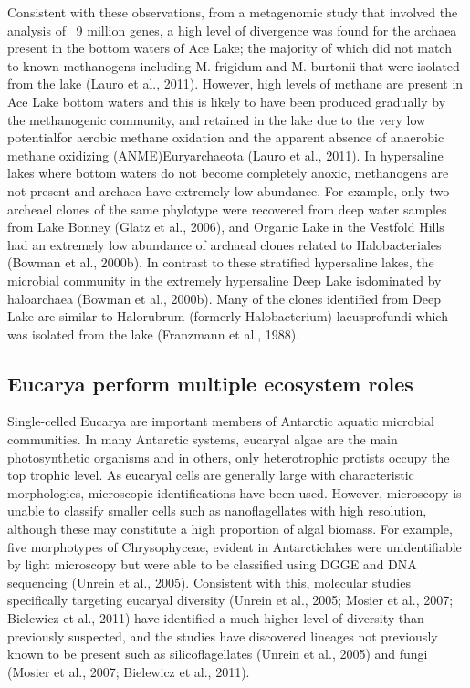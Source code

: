 \documentclass{book}
\begin{document}
Consistent with these observations, from a metagenomic study that involved the analysis of ~9 million genes, a high level of divergence was found for the archaea present in the bottom waters of Ace Lake; the majority of which did not match to known methanogens including M. frigidum and M. burtonii that were isolated from the lake (Lauro et al., 2011). 
However, high levels of methane are present in Ace Lake bottom waters and this is likely to have been produced gradually by the methanogenic community, and retained in the lake due to the very low potentialfor aerobic methane oxidation and the apparent absence of anaerobic methane oxidizing (ANME)Euryarchaeota (Lauro et al., 2011).
In hypersaline lakes where bottom waters do not become completely anoxic, methanogens are not present and archaea have extremely low abundance. 
For example, only two archeael clones of the same phylotype were recovered from deep water samples from Lake Bonney (Glatz et al., 2006), and Organic Lake in the Vestfold Hills had an extremely low abundance of archaeal clones related to Halobacteriales (Bowman et al., 2000b). 
In contrast to these stratified hypersaline lakes, the microbial community in the extremely hypersaline Deep Lake isdominated by haloarchaea (Bowman et al., 2000b). 
Many of the clones identified from Deep Lake are similar to Halorubrum (formerly Halobacterium) lacusprofundi which was isolated from the lake (Franzmann et al., 1988). 

\subsection{Eucarya perform multiple ecosystem roles}

Single-celled Eucarya are important members of Antarctic aquatic microbial communities.
In many Antarctic systems, eucaryal algae are the main photosynthetic organisms and in others, only heterotrophic protists occupy the top trophic level. 
As eucaryal cells are generally large with characteristic morphologies, microscopic identifications have been used. 
However, microscopy is unable to classify smaller cells such as nanoflagellates with high resolution, although these may constitute a high proportion of algal biomass.
For example, five morphotypes of Chrysophyceae, evident in Antarcticlakes were unidentifiable by light microscopy but were able to be classified using DGGE and DNA sequencing (Unrein et al., 2005).
Consistent with this, molecular studies specifically targeting eucaryal diversity (Unrein et al., 2005; Mosier et al., 2007; Bielewicz et al., 2011) have identified a much higher level of diversity than previously suspected, and the studies have discovered lineages not previously known to be present such as silicoflagellates (Unrein et al., 2005) and fungi (Mosier et al., 2007; Bielewicz et al., 2011).
\end{document}
